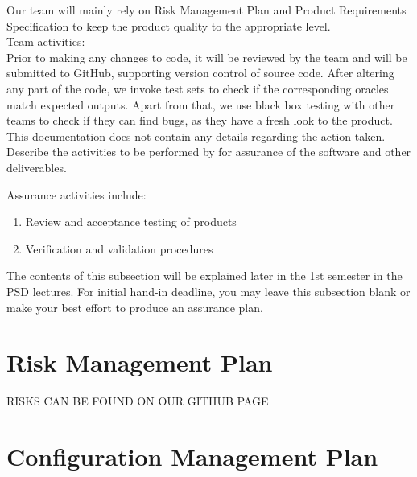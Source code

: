 \documentclass{l3deliverable}
\begin{document}
{Our team will mainly rely on Risk Management Plan and Product Requirements Specification to keep the product quality to the appropriate level.\\

Team activities:\\

Prior to making any changes to code, it will be reviewed by the team and will be submitted to GitHub, supporting version control of source code. After altering any part of the code, we invoke test sets to check if the corresponding oracles match expected outputs. Apart from that, we use black box testing with other teams to check if they can find bugs, as they have a fresh look to the product.\\

This documentation does not contain any details regarding the action taken.\\


Describe the activities to be performed by for assurance of the
software and other deliverables.

Assurance activities include:
\begin{enumerate}
\item Review and acceptance testing of products
\item Verification and validation procedures
\end{enumerate}

The contents of this subsection will be explained later in the 1st
semester in the PSD lectures. For initial hand-in deadline, you may
leave this subsection blank or make your best effort to produce an
assurance plan.


\section{Risk Management Plan}

RISKS CAN BE FOUND ON OUR GITHUB PAGE



\section{Configuration Management Plan}

}
\end{document}
